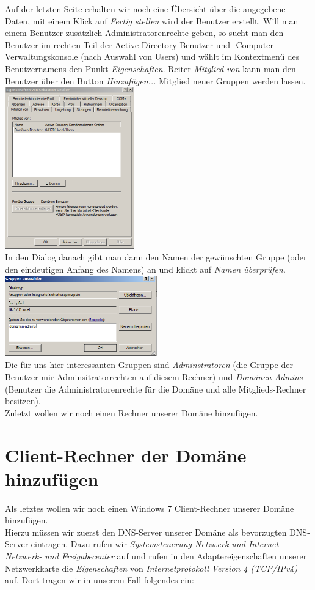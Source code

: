 \documentclass[12pt,a4paper,titlepage]{scrartcl} %
\begin{document}
Auf der letzten Seite erhalten wir noch eine Übersicht über die angegebene Daten, mit einem Klick auf \emph{Fertig stellen} wird der Benutzer erstellt.
Will man einem Benutzer zusätzlich Administratorenrechte geben, so sucht man den Benutzer im rechten Teil der Active Directory-Benutzer und -Computer Verwaltungskonsole (nach Auswahl von Users) und wählt im Kontextmenü des Benutzernamens den Punkt \emph{Eigenschaften}. Reiter \emph{Mitglied von} kann man den Benutzer über den Button \emph{Hinzufügen...} Mitglied neuer Gruppen werden lassen.\\

	\includegraphics[height=7cm]{Bilder/052}\\
	
In den Dialog danach gibt man dann den Namen der gewünschten Gruppe (oder den eindeutigen Anfang des Namens) an und klickt auf \emph{Namen überprüfen}.\\
	
	\includegraphics[height=3.5cm]{Bilder/053}\\
	
Die für uns hier interessanten Gruppen sind \emph{Adminstratoren} (die Gruppe der Benutzer mir Adminsitratorrechten auf diesem Rechner) und \emph{Domänen-Admins} (Benutzer die Administratorenrechte für die Domäne und alle Mitglieds-Rechner besitzen).\\
Zuletzt wollen wir noch einen Rechner unserer Domäne hinzufügen.

\newpage
\section{Client-Rechner der Domäne hinzufügen}
Als letztes wollen wir noch einen Windows 7 Client-Rechner unserer Domäne hinzufügen.\\
Hierzu müssen wir zuerst den DNS-Server unserer Domäne als bevorzugten DNS-Server eintragen. Dazu rufen wir \emph{Systemsteuerung  Netzwerk und Internet  Netzwerk- und Freigabecenter} auf und rufen in den Adaptereigenschaften unserer Netzwerkkarte die \emph{Eigenschaften} von \emph{Internetprotokoll Version 4 (TCP/IPv4)} auf. Dort tragen wir in unserem Fall folgendes ein:\\
\end{document}
